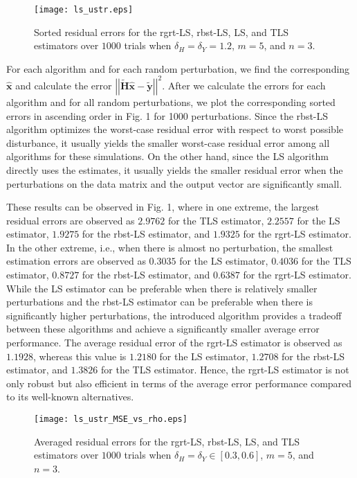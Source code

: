 \documentclass[review,sort&compress]{elsarticle}
\renewcommand{\vec}[1]{\mbox{$\mathbf{#1}$}}
\newcommand{\norm}[1]{\left|\left|#1\right|\right|}
\newcommand{\vx}{\vec{x}}
\newcommand{\tH}{\tilde{\vec{H}}}
\newcommand{\ty}{\tilde{\vec{y}}}
\begin{document}
\begin{figure}[t]
  \centering
  \texttt{[image: ls\_ustr.eps]}\\
  \caption{Sorted residual errors for the rgrt-LS, rbst-LS, LS, and TLS estimators over $1000$ trials when $\delta_H = \delta_Y = 1.2$, $m=5$, and $n=3$.}\label{fig:ls_ustr}
\end{figure}

For each algorithm and for each random perturbation, we find the corresponding $\hat{\vx}$ and calculate the error $\norm{ \tH \hat{\vx} - \ty}^2$. After we calculate the errors for each algorithm and for all random perturbations, we plot the corresponding sorted errors in ascending order in Fig. 1 for 1000 perturbations. Since the rbst-LS algorithm optimizes the worst-case residual error with respect to worst possible disturbance, it usually yields the smaller worst-case residual error among all algorithms for these simulations. On the other hand, since the LS algorithm directly uses the estimates, it usually yields the smaller residual error when the perturbations on the data matrix and the output vector are significantly small.

These results can be observed in Fig. 1, where in one extreme, the largest residual errors are observed as $2.9762$ for the TLS estimator, $2.2557$ for the LS estimator, $1.9275$ for the rbst-LS estimator, and $1.9325$ for the rgrt-LS estimator. In the other extreme, i.e., when there is almost no perturbation, the smallest estimation errors are observed as $0.3035$ for the LS estimator, $0.4036$ for the TLS estimator, $0.8727$ for the rbst-LS estimator, and $0.6387$ for the rgrt-LS estimator. While the LS estimator can be preferable when there is relatively smaller perturbations and the rbst-LS estimator can be preferable when there is significantly higher perturbations, the introduced algorithm provides a tradeoff between these algorithms and achieve a significantly smaller average error performance. The average residual error of the rgrt-LS estimator is observed as $1.1928$, whereas this value is $1.2180$ for the LS estimator, $1.2708$ for the rbst-LS estimator, and $1.3826$ for the TLS estimator. Hence, the rgrt-LS estimator is not only robust but also efficient in terms of the average error performance compared to its well-known alternatives.

\begin{figure}[t]
  \centering
  \texttt{[image: ls\_ustr\_MSE\_vs\_rho.eps]}\\
  \caption{Averaged residual errors for the rgrt-LS, rbst-LS, LS, and TLS estimators over $1000$ trials when $\delta_H = \delta_Y \in [0.3, 0.6]$, $m=5$, and $n=3$.}\label{fig:ls_ustr_MSE_vs_rho}
\end{figure}
\end{document}
